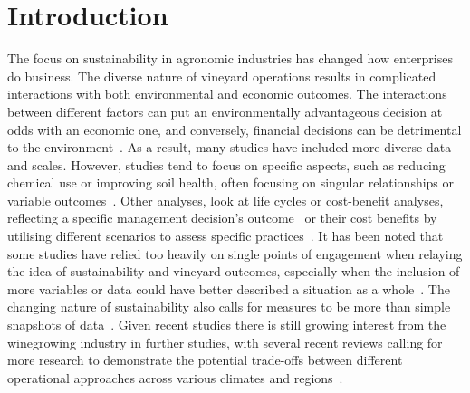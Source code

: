\documentclass[10pt,letterpaper]{article}
\begin{document}
\linenumbers

\section*{Introduction}

The focus on sustainability in agronomic industries has changed how enterprises do business. The diverse nature of vineyard operations results in complicated interactions with both environmental and economic outcomes. The interactions between different factors can put an environmentally advantageous decision at odds with an economic one, and conversely, financial decisions can be detrimental to the environment~\cite{beaumelleBiodiversityConservationEcosystem2023}. As a result, many studies have included more diverse data and scales. However, studies tend to focus on specific aspects, such as reducing chemical use or improving soil health, often focusing on singular relationships or variable outcomes~\cite{barriguinhaVineyardYieldEstimation2021,heFruitYieldPrediction2022,laurentReviewIssuesMethods2021}. Other analyses, look at life cycles or cost-benefit analyses, reflecting a specific management decision's outcome~\cite{abbottAWRIAssessingEnvironmental2016,beauchetInterannualVariabilityEnvironmental2019,ferraraLifeCycleAssessment2018} or their cost benefits by utilising different scenarios to assess specific practices~\cite{fincoCombiningPrecisionViticulture2022a,singhBibliometricReviewUse2022}. It has been noted that some studies have relied too heavily on single points of engagement when relaying the idea of sustainability and vineyard outcomes, especially when the inclusion of more variables or data could have better described a situation as a whole~\cite{baianoOverviewSustainabilityWine2021,santiago-brownSustainabilityAssessmentWineGrape2015}. The changing nature of sustainability also calls for measures to be more than simple snapshots of data~\cite{baianoOverviewSustainabilityWine2021,montalvo-falconSustainabilityResearchWine2023,santiago-brownSustainabilityAssessmentWineGrape2015}. Given recent studies there is still growing interest from the winegrowing industry in further studies, with several recent reviews calling for more research to demonstrate the potential trade-offs between different operational approaches across various climates and regions~\cite{baianoOverviewSustainabilityWine2021,marianiSustainableWinegrowingCurrent2015,montalvo-falconSustainabilityResearchWine2023}.
\end{document}
